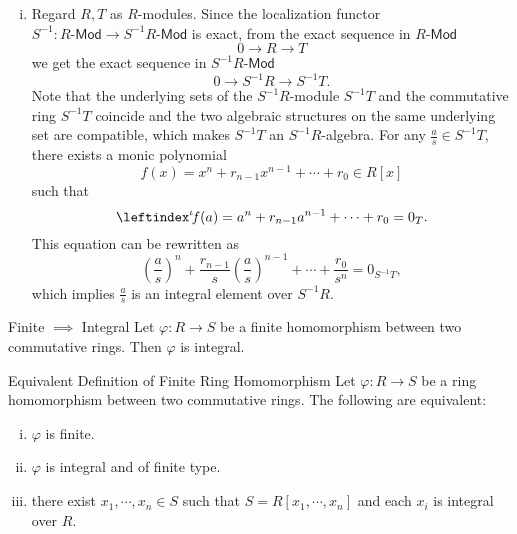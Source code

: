 \begin{prf}
\begin{enumerate}[(i)]
\[    \]
    Hence $\{t_1+\mathfrak{b},\cdots,t_n+\mathfrak{b}\}$ generates $T/\mathfrak{b}$. Therefore we proved $T/\mathfrak{b}$ is a finitely generated $R/\mathfrak{a}$-module, which implies $\overline{\varphi}$ is finite.
    \item Regard $R,T$ as $R$-modules. Since the localization functor $S^{-1}:R\text{-}\mathsf{Mod}\to S^{-1}R\text{-}\mathsf{Mod}$ is exact, from the exact sequence in $R\text{-}\mathsf{Mod}$
    \[
    0\longrightarrow R\longrightarrow T
    \]
    we get the exact sequence in $S^{-1}R\text{-}\mathsf{Mod}$
    \[
    0\longrightarrow S^{-1}R\longrightarrow S^{-1}T.
    \]
    Note that the underlying sets of the $S^{-1}R$-module $S^{-1}T$ and the commutative ring $S^{-1}T$ coincide and the two algebraic structures on the same underlying set are compatible, which makes $S^{-1}T$ an $S^{-1}R$-algebra. 
    For any $\frac{a}{s}\in S^{-1}T$, there exists a monic polynomial
    \[
    f(x)=x^n+r_{n-1}x^{n-1}+\cdots+r_0\in R[x]
    \]
    such that 
    \[
        \leftindex^{\iota}\!f(a)=a^n+r_{n-1}a^{n-1}+\cdots+r_0=0_T.
    \]
    This equation can be rewritten as
    \[
\left(\frac{a}{s}\right)^n+\frac{r_{n-1}}{s}\left(\frac{a}{s}\right)^{n-1}+\cdots+\frac{r_0}{s^n}=0_{S^{-1}T},
    \]
    which implies $\frac{a}{s}$ is an integral element over $S^{-1}R$.
    

\end{enumerate}
\end{prf}



\begin{lemma}{Finite $\implies$ Integral}{}
    Let $\varphi:R\to S$ be a finite homomorphism between two commutative rings. Then $\varphi$ is integral.
\end{lemma}

\begin{proposition}{Equivalent Definition of Finite Ring Homomorphism}{}
    Let $\varphi:R\to S$ be a ring homomorphism between two commutative rings. The following are equivalent:
    \begin{enumerate}[(i)]
        \item $\varphi$ is finite.
        \item $\varphi$ is integral and of finite type.
        \item there exist $x_1,\cdots ,x_n\in S$ such that $S=R[x_1,\cdots ,x_n]$ and each $x_i$ is integral over $R$.
    \end{enumerate}
\end{proposition}

